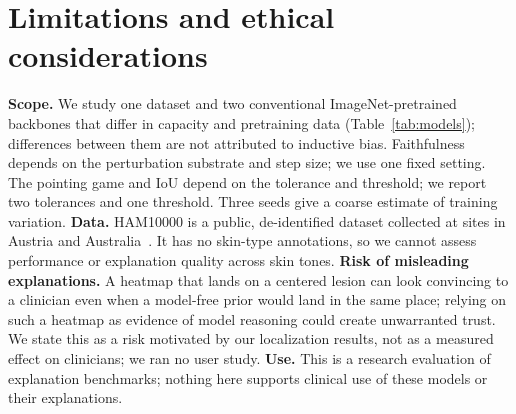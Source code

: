 \section{Limitations and ethical considerations}
\label{sec:limitations}
\textbf{Scope.} We study one dataset and two conventional ImageNet-pretrained backbones that differ in
capacity and pretraining data (Table~\ref{tab:models}); differences between them are not attributed to
inductive bias. Faithfulness depends on the perturbation substrate and step size; we use one fixed
setting. The pointing game and IoU depend on the tolerance and threshold; we report two tolerances and
one threshold. Three seeds give a coarse estimate of training variation.
\textbf{Data.} HAM10000 is a public, de-identified dataset collected at sites in Austria and
Australia~\cite{tschandl2018ham10000}. It has no skin-type annotations, so we cannot assess performance
or explanation quality across skin tones. \textbf{Risk of misleading explanations.} A heatmap that lands on a centered lesion can look convincing to a
clinician even when a model-free prior would land in the same place; relying on such a heatmap as evidence of
model reasoning could create unwarranted trust. We state this as a risk motivated by our localization results,
not as a measured effect on clinicians; we ran no user study. \textbf{Use.} This is a research evaluation of
explanation benchmarks; nothing here supports clinical use of these models or their explanations.
